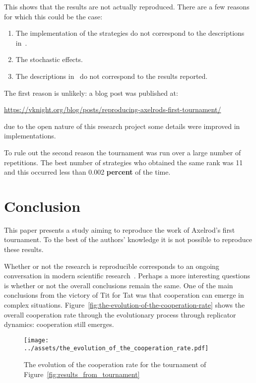 \documentclass[a4paper]{article}
\begin{document}
This shows that the results are not actually reproduced. There are a few reasons
for which this could be the case:

\begin{enumerate}
    \item The implementation of the strategies do not correspond to the
        descriptions in~\cite{axelrod1980effective}.
    \item The stochastic effects.
    \item The descriptions in~\cite{axelrod1980effective} do not correspond to the results reported.
\end{enumerate}

The first reason is unlikely: a blog post was published at:
\begin{center}
    \url{https://vknight.org/blog/posts/reproducing-axelrods-first-tournament/}
\end{center}
due to the open nature of this research project some details were improved in
implementations.

To rule out the second reason the tournament was run over a large number of
repetitions. The best number of strategies who obtained the same rank was 11 and
this occurred less than 0.002 \textbf{percent} of the time.

\section{Conclusion}

This paper presents a study aiming to reproduce the work of Axelrod's first
tournament. To the best of the authors' knowledge it is not possible to
reproduce these results.

Whether or not the research is reproducible corresponds to an ongoing
conversation in modern scientific research~\cite{wilson2014best}. Perhaps a more
interesting questions is whether or not the overall conclusions remain the same.
One of the main conclusions from the victory of Tit for Tat was that cooperation
can emerge in complex situations.
Figure~\ref{fig:the-evolution-of-the-cooperation-rate} shows the overall
cooperation rate through the evolutionary process through replicator dynamics:
cooperation still emerges.

\begin{figure}[!htbp]
    \begin{center}
        \texttt{[image: ../assets/the\_evolution\_of\_the\_cooperation\_rate.pdf]}
    \end{center}
    \caption{The evolution of the cooperation rate for the tournament of Figure~\ref{fig:results_from_tournament}}
    \label{fig:the_evolution_of_the_cooperation_rate}
\end{figure}



\end{document}
